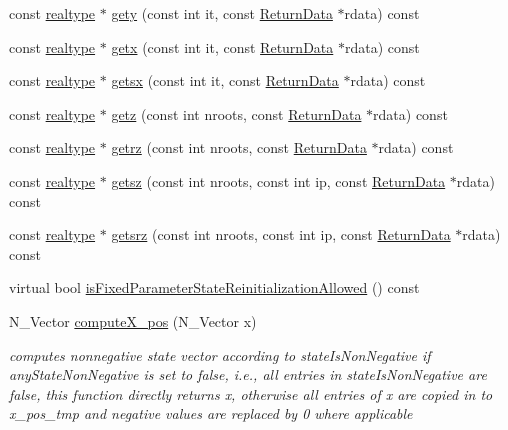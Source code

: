 \begin{DoxyCompactItemize}
\item 
const \mbox{\hyperlink{namespaceamici_a1bdce28051d6a53868f7ccbf5f2c14a3}{realtype}} $\ast$ \mbox{\hyperlink{classamici_1_1_model_aee6c7b534a091180c01aabb3be44a216}{gety}} (const int it, const \mbox{\hyperlink{classamici_1_1_return_data}{Return\+Data}} $\ast$rdata) const
\item 
const \mbox{\hyperlink{namespaceamici_a1bdce28051d6a53868f7ccbf5f2c14a3}{realtype}} $\ast$ \mbox{\hyperlink{classamici_1_1_model_abefad4b8b4ba76bad66f57504affca9b}{getx}} (const int it, const \mbox{\hyperlink{classamici_1_1_return_data}{Return\+Data}} $\ast$rdata) const
\item 
const \mbox{\hyperlink{namespaceamici_a1bdce28051d6a53868f7ccbf5f2c14a3}{realtype}} $\ast$ \mbox{\hyperlink{classamici_1_1_model_ae808a142aab292ef1b424bc3a0d924a0}{getsx}} (const int it, const \mbox{\hyperlink{classamici_1_1_return_data}{Return\+Data}} $\ast$rdata) const
\item 
const \mbox{\hyperlink{namespaceamici_a1bdce28051d6a53868f7ccbf5f2c14a3}{realtype}} $\ast$ \mbox{\hyperlink{classamici_1_1_model_a30571e418f94ca61b8df2b355e46ee1a}{getz}} (const int nroots, const \mbox{\hyperlink{classamici_1_1_return_data}{Return\+Data}} $\ast$rdata) const
\item 
const \mbox{\hyperlink{namespaceamici_a1bdce28051d6a53868f7ccbf5f2c14a3}{realtype}} $\ast$ \mbox{\hyperlink{classamici_1_1_model_ab2a9be3bb641741a52ddc48fcd9aa143}{getrz}} (const int nroots, const \mbox{\hyperlink{classamici_1_1_return_data}{Return\+Data}} $\ast$rdata) const
\item 
const \mbox{\hyperlink{namespaceamici_a1bdce28051d6a53868f7ccbf5f2c14a3}{realtype}} $\ast$ \mbox{\hyperlink{classamici_1_1_model_a78863f621eda7016ab7136a357dacdaf}{getsz}} (const int nroots, const int ip, const \mbox{\hyperlink{classamici_1_1_return_data}{Return\+Data}} $\ast$rdata) const
\item 
const \mbox{\hyperlink{namespaceamici_a1bdce28051d6a53868f7ccbf5f2c14a3}{realtype}} $\ast$ \mbox{\hyperlink{classamici_1_1_model_a49336e5923942fc5b4b26d6facf90b1d}{getsrz}} (const int nroots, const int ip, const \mbox{\hyperlink{classamici_1_1_return_data}{Return\+Data}} $\ast$rdata) const
\item 
virtual bool \mbox{\hyperlink{classamici_1_1_model_aee70a0075a3b36896dee7ba80415df3c}{is\+Fixed\+Parameter\+State\+Reinitialization\+Allowed}} () const
\item 
N\+\_\+\+Vector \mbox{\hyperlink{classamici_1_1_model_a0c06c5326bb82ceedba30171c122cb8a}{compute\+X\+\_\+pos}} (N\+\_\+\+Vector x)
\begin{DoxyCompactList}\small\item\em computes nonnegative state vector according to state\+Is\+Non\+Negative if any\+State\+Non\+Negative is set to false, i.\+e., all entries in state\+Is\+Non\+Negative are false, this function directly returns x, otherwise all entries of x are copied in to x\+\_\+pos\+\_\+tmp and negative values are replaced by 0 where applicable \end{DoxyCompactList}\end{DoxyCompactItemize}
